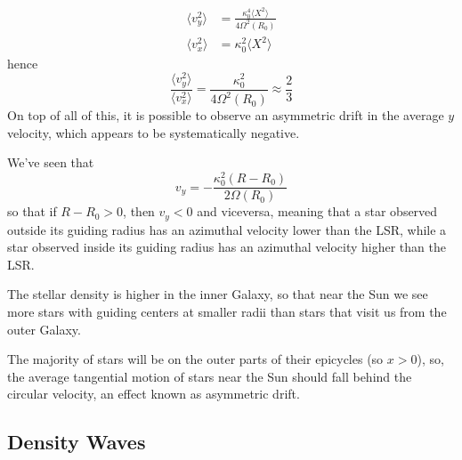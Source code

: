 \begin{align*}
    \langle v_{y}^{2}\rangle &= \frac{\kappa_{0}^{4}\langle X^{2}\rangle}{4\Omega^{2}(R_{0})}\\
    \langle v_{x}^{2}\rangle &= \kappa_{0}^{2}\langle X^{2}\rangle
\end{align*}
hence 
\begin{equation*}
    \frac{ \langle v_{y}^{2}\rangle}{ \langle v_{x}^{2}\rangle} = \frac{\kappa_{0}^{2}}{4\Omega^{2}(R_{0})}\approx \frac{2}{3}
\end{equation*}
On top of all of this, it is possible to observe an asymmetric drift in the average $y$ velocity, which appears to be systematically negative.
\par We've seen that 
\begin{equation*}
     v_{y} = -\frac{\kappa_{0}^{2}(R-R_{0})}{2\Omega(R_{0})}
\end{equation*}
so that if $R-R_{0}>0$, then $v_{y}<0$ and viceversa, meaning that a star observed outside its guiding radius has an azimuthal velocity lower than the LSR, while a star observed inside its guiding radius has an azimuthal velocity higher than the LSR.
\par The stellar density is higher in the inner Galaxy, so that near the Sun we see more stars with guiding centers at smaller radii than stars that visit us from the outer Galaxy.
\par The majority of stars will be on the outer parts of their epicycles (so $x > 0$), so, the average tangential motion of stars near the Sun should fall behind the circular velocity, an effect known as asymmetric drift.

\subsection{Density Waves}


